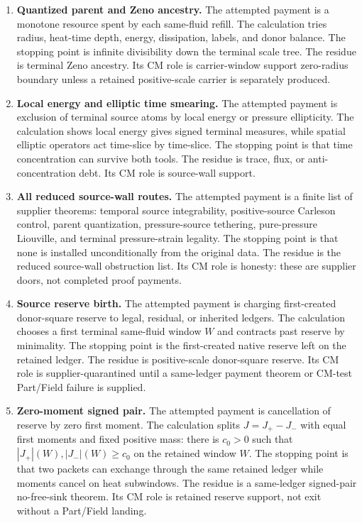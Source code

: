 \begin{enumerate}[leftmargin=*,label=\arabic*.]
\item \textbf{Quantized parent and Zeno ancestry.}
The attempted payment is a monotone resource spent by each same-fluid refill.
The calculation tries radius, heat-time depth, energy, dissipation, labels, and
donor balance.
The stopping point is infinite divisibility down the terminal scale tree.
The residue is terminal Zeno ancestry.
Its CM role is carrier-window support zero-radius boundary unless a retained positive-scale
carrier is separately produced.

\item \textbf{Local energy and elliptic time smearing.}
The attempted payment is exclusion of terminal source atoms by local energy or
pressure ellipticity.
The calculation shows local energy gives signed terminal measures, while
spatial elliptic operators act time-slice by time-slice.
The stopping point is that time concentration can survive both tools.
The residue is trace, flux, or anti-concentration debt.
Its CM role is source-wall support.

\item \textbf{All reduced source-wall routes.}
The attempted payment is a finite list of supplier theorems:
temporal source integrability, positive-source Carleson control, parent
quantization, pressure-source tethering, pure-pressure Liouville, and terminal
pressure-strain legality.
The stopping point is that none is installed unconditionally from the original
data.
The residue is the reduced source-wall obstruction list.
Its CM role is honesty: these are supplier doors, not completed proof payments.

\item \textbf{Source reserve birth.}
The attempted payment is charging first-created donor-square reserve to legal,
residual, or inherited ledgers.
The calculation chooses a first terminal same-fluid window \(W\) and contracts
past reserve by minimality.
The stopping point is the first-created native reserve left on the retained
ledger.
The residue is positive-scale donor-square reserve.
Its CM role is supplier-quarantined until a same-ledger payment theorem or
CM-test Part/Field failure is supplied.

\item \textbf{Zero-moment signed pair.}
The attempted payment is cancellation of reserve by zero first moment.
The calculation splits \(J=J_+-J_-\) with equal first moments and fixed
positive mass: there is \(c_0>0\) such that
\(|J_+|(W),|J_-|(W)\ge c_0\) on the retained window \(W\).
The stopping point is that two packets can exchange through the same retained
ledger while moments cancel on heat subwindows.
The residue is a same-ledger signed-pair no-free-sink theorem.
Its CM role is retained reserve support, not exit without a Part/Field landing.


\end{enumerate}
